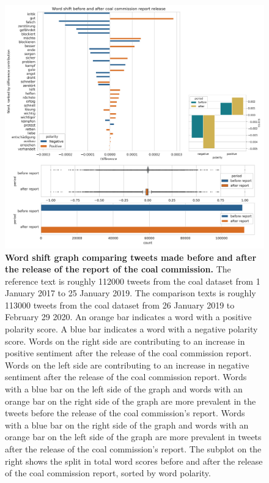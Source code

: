 \documentclass[12pt,onecolumn,twoside]{layout}
\begin{document}
\begin{figure} 
	\begin{center}
		\includegraphics[width=\linewidth]{figures/wordshift_coalcomm_report_composite}
	\end{center}
	\caption{\textbf{Word shift graph comparing tweets made before and after the release of the report of the coal commission.} The reference text is roughly 112000 tweets from the coal dataset from 1 January 2017 to 25 January 2019. The comparison texts is roughly 113000 tweets from the coal dataset from 26 January 2019 to February 29 2020. An orange bar indicates a word with a positive polarity score. A blue bar indicates a word with a negative polarity score. Words on the right side are contributing to an increase in positive sentiment after the release of the coal commission report. Words on the left side are contributing to an increase in negative sentiment after the release of the coal commission report. Words with a blue bar on the left side of the graph and words with an orange bar on the right side of the graph are more prevalent in the tweets before the release of the coal commission's report. Words with a blue bar on the right side of the graph and words with an orange bar on the left side of the graph are more prevalent in tweets after the release of the coal commission's report. The subplot on the right shows the split in total word scores before and after the release of the coal commission report, sorted by word polarity. \footnotemark}
	\label{fig:wordshift_coalcomm_report}
\end{figure}
\end{document}
